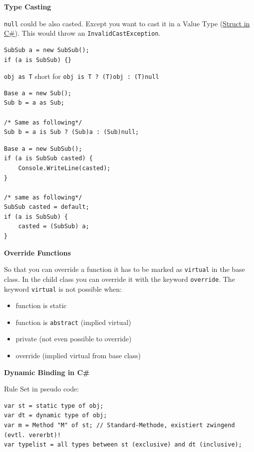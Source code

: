 \documentclass[11pt,twoside,landscape]{article}
\begin{document}
\begin{multicols}{3}
\textbf{Type Casting}

\texttt{null} could be also casted.
Except you want to cast it in a Value Type (\href{../../../roam/20211008085202-struct_in_c.org}{Struct in C\#}).
This would throw an \texttt{InvalidCastException}.
\lstset{language=csharp,label= ,caption= ,captionpos=b,numbers=none}
\begin{lstlisting}
SubSub a = new SubSub();
if (a is SubSub) {}
\end{lstlisting}

\texttt{obj as T} short for \texttt{obj is T ? (T)obj : (T)null}
\lstset{language=csharp,label= ,caption= ,captionpos=b,numbers=none}
\begin{lstlisting}
Base a = new Sub();
Sub b = a as Sub;

/* Same as following*/
Sub b = a is Sub ? (Sub)a : (Sub)null;
\end{lstlisting}

\lstset{language=csharp,label= ,caption= ,captionpos=b,numbers=none}
\begin{lstlisting}
Base a = new SubSub();
if (a is SubSub casted) {
    Console.WriteLine(casted);
}

/* same as following*/ 
SubSub casted = default;
if (a is SubSub) {
    casted = (SubSub) a;
}
\end{lstlisting}

\textbf{Override Functions}

So that you can override a function it has to be marked as \texttt{virtual} in the base class.
In the child class you can override it with the keyword \texttt{override}.
The keyword \texttt{virtual} is not possible when:
\begin{itemize}
\item function is static
\item function is \texttt{abstract} (implied virtual)
\item private (not even possible to override)
\item override (implied virtual from base class)
\end{itemize}


\textbf{Dynamic Binding in C\#}

Rule Set in pseudo code:
\lstset{language=csharp,label= ,caption= ,captionpos=b,numbers=none}
\begin{lstlisting}
var st = static type of obj;
var dt = dynamic type of obj;
var m = Method "M" of st; // Standard-Methode, existiert zwingend (evtl. vererbt)!
var typelist = all types between st (exclusive) and dt (inclusive);


\end{lstlisting}
\end{multicols}
\end{document}
